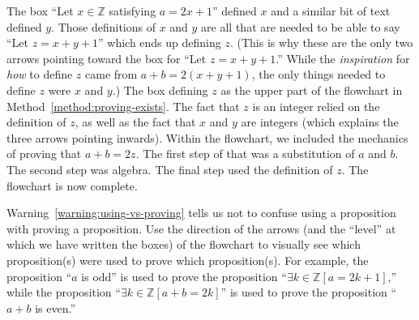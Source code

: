 \documentclass{book}
\theoremstyle{ekimcustom}
\begin{document}
The box ``Let $x \in \mathbb{Z}$ satisfying $a = 2x+1$'' defined $x$ and a similar bit of text defined $y$. Those definitions of $x$ and $y$ are all that are needed to be able to say ``Let $z = x+y+1$'' which ends up defining $z$. (This is why these are the only two arrows pointing toward the box for ``Let $z=x+y+1$.'' While the \emph{inspiration} for \emph{how} to define $z$ came from $a+b=2(x+y+1)$, the only things needed to define $z$ were $x$ and $y$.) The box defining $z$ as the upper part of the flowchart in Method~\ref{method:proving-exists}. The fact that $z$ is an integer relied on the definition of $z$, as well as the fact that $x$ and $y$ are integers (which explains the three arrows pointing inwards). Within the flowchart, we included the mechanics of proving that $a+b=2z$. The first step of that was a substitution of $a$ and $b$. The second step was algebra. The final step used the definition of $z$. The flowchart is now complete.

Warning~\ref{warning:using-vs-proving} tells us not to confuse using a proposition with proving a proposition. Use the direction of the arrows (and the ``level'' at which we have written the boxes) of the flowchart to visually see which proposition(s) were used to prove which proposition(s). For example, the proposition ``$a$ is odd'' is used to prove the proposition ``$\exists k \in \mathbb{Z} [a=2k+1]$,'' while the proposition ``$\exists k \in \mathbb{Z} [a+b=2k]$'' is used to prove the proposition ``$a+b$ is even.''
\end{document}
